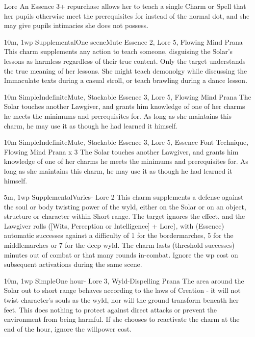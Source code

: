 \begin{Ability}{Lore}
  An Essence 3+ repurchase allows her to teach a single Charm or Spell that her pupils otherwise meet the prerequisites for instead of the normal dot, and she may give pupils intimacies she does not possess.

  {10m, 1wp}
  {Supplemental}{One scene}{Mute}
  {Essence 2, Lore 5, Flowing Mind Prana}
  This charm supplements any action to teach someone, disguising the Solar's lessons as harmless regardless of their true content. Only the target understands the true meaning of her lessons. She might teach demonolgy while discussing the Immaculate texts during a casual stroll, or teach brawling during a dance lesson.

  {10m}
  {Simple}{Indefinite}{Mute, Stackable}
  {Essence 3, Lore 5, Flowing Mind Prana}
  The Solar touches another Lawgiver, and grants him knowledge of one of her charms he meets the minimums and prerequisites for. As long as she maintains this charm, he may use it as though he had learned it himself.

  {10m}
  {Simple}{Indefinite}{Mute, Stackable}
  {Essence 3, Lore 5, Essence Font Technique, Flowing Mind Prana x 3}
  The Solar touches another Lawgiver, and grants him knowledge of one of her charms he meets the minimums and prerequisites for. As long as she maintains this charm, he may use it as though he had learned it himself.

  {5m, 1wp}
  {Supplemental}{Varies}{-}
  {Lore 2}
  This charm supplements a defense against the soul or body twisting power of the wyld, either on the Solar or on an object, structure or character within Short range. The target ignores the effect, and the Lawgiver rolls ([Wits, Perception or Intelligence] + Lore), with (Essence) automatic successes against a difficulty of 1 for the bordermarches, 5 for the middlemarches or 7 for the deep wyld. The charm lasts (threshold successes) minutes out of combat or that many rounds in-combat. Ignore the wp cost on subsequent activations during the same scene.

  {10m, 1wp}
  {Simple}{One hour}{-}
  {Lore 3, Wyld-Dispelling Prana}
  The area around the Solar out to short range behaves according to the laws of Creation - it will not twist character's souls as the wyld, nor will the ground transform beneath her feet. This does nothing to protect against direct attacks or prevent the environment from being harmful. If she chooses to reactivate the charm at the end of the hour, ignore the willpower cost.


\end{Ability}
